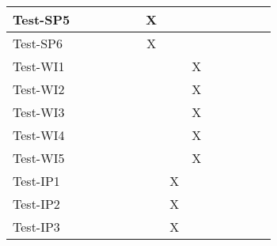 \documentclass[12pt, titlepage]{article}
\begin{document}
\begin{table}[H]
\begin{adjustwidth}{-0.3in}{-0.5in}
{\begin{tabular}{c|c|c|c|c|c|c|c|c|c|c|c|c|c|}
\multicolumn{1}{|l|}{{Test-SP5}}   &             &             &             &             &             &       X      &             &             &              &             &                           &  &                    \\ \hline
\multicolumn{1}{|l|}{{Test-SP6}}   &             &             &             &             &             &       X      &            &             &              &             &                           &  &                    \\ \hline
\multicolumn{1}{|l|}{{Test-WI1}}   &             &             &             &             &             &             &             &     X        &              &              &                           &  &                    \\ \hline
\multicolumn{1}{|l|}{{Test-WI2}}   &             &             &             &             &             &             &             &    X         &              &              &                           &  &                    \\ \hline
\multicolumn{1}{|l|}{{Test-WI3}}   &             &             &             &             &             &             &             &    X         &              &              &                           &  &                    \\ \hline
\multicolumn{1}{|l|}{{Test-WI4}}   &             &             &             &             &             &             &             &    X         &              &              &                           &  &                    \\ \hline
\multicolumn{1}{|l|}{{Test-WI5}}   &             &             &             &             &             &             &             &    X         &              &              &                           &  &                    \\ \hline
\multicolumn{1}{|l|}{{Test-IP1}}   &             &             &             &             &             &             &      X       &             &              &              &                           &  &                    \\ \hline
\multicolumn{1}{|l|}{{Test-IP2}}   &             &             &             &             &             &             &       X      &             &              &              &                           &  &                    \\ \hline
\multicolumn{1}{|l|}{{Test-IP3}}   &             &             &             &             &             &             &       X      &             &              &              &                           &  &                    \\ \hline

\end{tabular}}
\end{adjustwidth}
\end{table}
\end{document}
